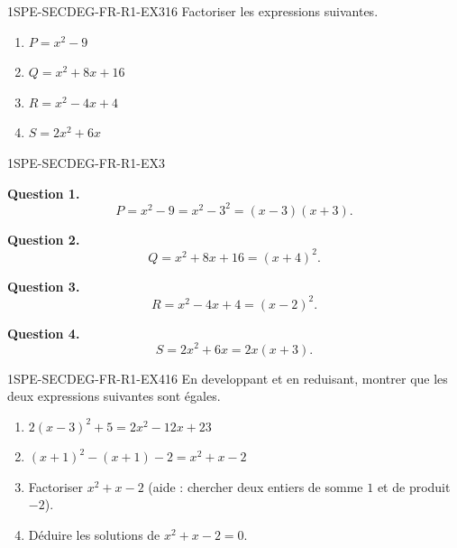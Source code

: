 
\begin{exercice}{1SPE-SECDEG-FR-R1-EX3}{1}{6}
Factoriser les expressions suivantes.
\begin{enumerate}
  \item $P = x^2 - 9$
  \item $Q = x^2 + 8x + 16$
  \item $R = x^2 - 4x + 4$
  \item $S = 2x^2 + 6x$
\end{enumerate}
\end{exercice}


\begin{corrige}{1SPE-SECDEG-FR-R1-EX3}


\textbf{Question 1.}
\[
P = x^2 - 9 = x^2 - 3^2 = (x-3)(x+3).
\]


\textbf{Question 2.}
\[
Q = x^2 + 8x + 16 = (x + 4)^2.
\]


\textbf{Question 3.}
\[
R = x^2 - 4x + 4 = (x - 2)^2.
\]


\textbf{Question 4.}
\[
S = 2x^2 + 6x = 2x(x + 3).
\]

\end{corrige}


\begin{exercice}{1SPE-SECDEG-FR-R1-EX4}{1}{6}
En developpant et en reduisant, montrer que les deux expressions suivantes sont égales.
\begin{enumerate}
  \item $2(x-3)^2 + 5 = 2x^2 - 12x + 23$
  \item $(x+1)^2 - (x+1) - 2 = x^2 + x - 2$
  \item Factoriser $x^2 + x - 2$ (aide : chercher deux entiers de somme $1$ et de produit $-2$).
  \item Déduire les solutions de $x^2 + x - 2 = 0$.
\end{enumerate}
\end{exercice}

